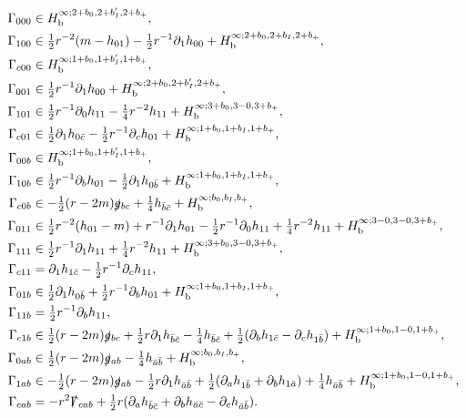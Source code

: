 \documentclass[reqno,11pt,letterpaper]{amsart}
\numberwithin{equation}{section}
\numberwithin{figure}{section}
\theoremstyle{definition}
\theoremstyle{remark}
\newcommand{\slg}{\slashed{g}{}}
\newcommand{\slGamma}{\slashed{\Gamma}{}}
\newcommand{\pa}{\partial}
\newcommand{\bop}{{\mathrm{b}}}
\newcommand{\half}{\tfrac{1}{2}}
\newcommand{\Hb}{H_{\bop}}
\begin{document}
\begin{align*}
  \Gamma_{0 0 0} &\in \Hb^{\infty;2+b_0,2+b'_I,2+b_+}, \\
  \Gamma_{1 0 0} &\in \half r^{-2}(m-h_{0 1}) - \half r^{-1}\pa_1 h_{0 0} + \Hb^{\infty;2+b_0,2+b_I,2+b_+}, \\
  \Gamma_{c 0 0} &\in \Hb^{\infty;1+b_0,1+b'_I,1+b_+}, \\
  \Gamma_{0 0 1} &\in \half r^{-1}\pa_1 h_{0 0} + \Hb^{\infty;2+b_0,2+b'_I,2+b_+}, \\
  \Gamma_{1 0 1} &\in \half r^{-1}\pa_0 h_{1 1} - \tfrac14 r^{-2}h_{1 1} + \Hb^{\infty;3+b_0,3-0,3+b_+}, \\
  \Gamma_{c 0 1} &\in \half\pa_1 h_{0\bar c} - \half r^{-1}\pa_c h_{0 1} + \Hb^{\infty;1+b_0,1+b_I,1+b_+}, \\
  \Gamma_{0 0 b} &\in \Hb^{\infty;1+b_0,1+b'_I,1+b_+}, \\
  \Gamma_{1 0 b} &\in \half r^{-1}\pa_b h_{0 1}-\half\pa_1 h_{0\bar b} + \Hb^{\infty;1+b_0,1+b_I,1+b_+}, \\
  \Gamma_{c 0 b} &\in -\half(r-2 m)\slg_{b c} + \tfrac14 h_{\bar b\bar c} + \Hb^{\infty;b_0,b_I,b_+}, \\
  \Gamma_{0 1 1} &\in \half r^{-2}(h_{0 1}-m) + r^{-1}\pa_1 h_{0 1} - \half r^{-1}\pa_0 h_{1 1} + \tfrac14 r^{-2}h_{1 1} + \Hb^{\infty;3-0,3-0,3+b_+}, \\
  \Gamma_{1 1 1} &\in \half r^{-1}\pa_1 h_{1 1} + \tfrac14 r^{-2}h_{1 1} + \Hb^{\infty;3+b_0,3-0,3+b_+}, \\
  \Gamma_{c 1 1} &= \pa_1 h_{1\bar c} - \half r^{-1}\pa_c h_{1 1}, \\
  \Gamma_{0 1 b} &\in \half\pa_1 h_{0\bar b}+\half r^{-1}\pa_b h_{0 1} + \Hb^{\infty;1+b_0,1+b_I,1+b_+}, \\
  \Gamma_{1 1 b} &= \half r^{-1}\pa_b h_{1 1}, \\
  \Gamma_{c 1 b} &\in \half(r-2 m)\slg_{b c}+\half r\pa_1 h_{\bar b\bar c} - \tfrac14 h_{\bar b\bar c} + \half(\pa_b h_{1\bar c}-\pa_c h_{1\bar b}) + \Hb^{\infty;1+b_0,1-0,1+b_+}, \\
  \Gamma_{0 a b} &\in \half(r-2 m)\slg_{a b}-\tfrac14 h_{\bar a\bar b} + \Hb^{\infty;b_0,b_I,b_+}, \\
  \Gamma_{1 a b} &\in -\half(r-2 m)\slg_{a b}-\half r\pa_1 h_{\bar a\bar b} + \half(\pa_a h_{1\bar b}+\pa_b h_{1\bar a}) + \tfrac14 h_{\bar a\bar b} + \Hb^{\infty;1+b_0,1-0,1+b_+}, \\
  \Gamma_{c a b} &= -r^2\slGamma_{c a b} + \half r(\pa_a h_{\bar b\bar c}+\pa_b h_{\bar a\bar c}-\pa_c h_{\bar a\bar b}).
\end{align*}
\end{document}
